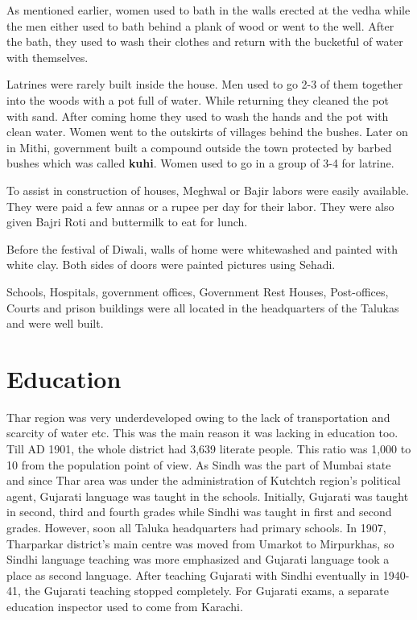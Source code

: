 As mentioned earlier, women used to bath in the walls erected at the vedha
while the men either used to bath behind a plank of wood or went to the well.
After the bath, they used to wash their clothes and return with the
bucketful of water with themselves.

Latrines were rarely built inside the house. Men used to go 2-3 of them together
into the woods with a pot full of water. While returning they cleaned the pot
with sand. After coming home they used to wash the hands and the pot with clean
water. Women went to the outskirts of villages behind the bushes. Later on in
Mithi, government built a compound outside the town protected by barbed bushes
which was called \textbf{kuhi}. Women used to go in a group of 3-4 for latrine.

To assist in construction of houses, Meghwal or Bajir labors were easily
available. They were paid a few annas or a rupee per day for their labor. They
were also given Bajri Roti and buttermilk to eat for lunch.

Before the festival of Diwali, walls of home were whitewashed and painted with
white clay. Both sides of doors were painted pictures using Sehadi.

Schools, Hospitals, government offices, Government Rest Houses, Post-offices,
Courts and prison buildings were all located in the headquarters of the Talukas
and were well built.

\section{Education}
Thar region was very underdeveloped owing to the lack of transportation and
scarcity of water etc. This was the main reason it was lacking in education too.
Till AD 1901, the whole district had 3,639 literate people. This ratio was 1,000
to 10 from the population point of view.
As Sindh was the part of Mumbai state and since Thar area was under the
administration of Kutchtch region's political agent, Gujarati language was taught
in the schools. Initially, Gujarati was taught in second, third and fourth
grades while Sindhi was taught in first and second grades. However, soon all
Taluka headquarters had primary schools. In 1907, Tharparkar district's main
centre was moved from Umarkot to Mirpurkhas, so Sindhi language teaching was
more emphasized and Gujarati language took a place as second language. After
teaching Gujarati with Sindhi eventually in 1940-41, the Gujarati teaching
stopped completely. For Gujarati exams, a separate education inspector used to
come from Karachi.

